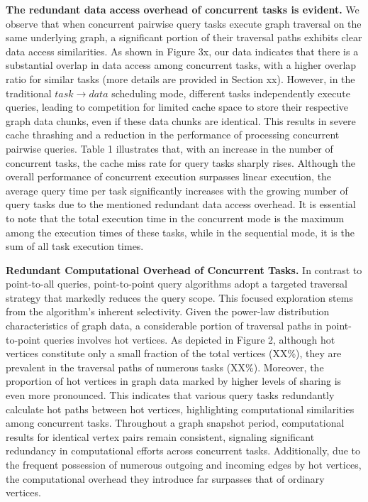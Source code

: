 \documentclass[lettersize,journal]{IEEEtran} %
\begin{document}
{\bf{The redundant data access overhead of concurrent tasks is evident.}} We observe that when concurrent pairwise query tasks execute graph traversal on the same underlying graph, a significant portion of their traversal paths exhibits clear data access similarities. As shown in Figure 3x, our data indicates that there is a substantial overlap in data access among concurrent tasks, with a higher overlap ratio for similar tasks (more details are provided in Section xx). However, in the traditional $task \rightarrow data$ scheduling mode, different tasks independently execute queries, leading to competition for limited cache space to store their respective graph data chunks, even if these data chunks are identical. This results in severe cache thrashing and a reduction in the performance of processing concurrent pairwise queries. Table 1 illustrates that, with an increase in the number of concurrent tasks, the cache miss rate for query tasks sharply rises. Although the overall performance of concurrent execution surpasses linear execution, the average query time per task significantly increases with the growing number of query tasks due to the mentioned redundant data access overhead. It is essential to note that the total execution time in the concurrent mode is the maximum among the execution times of these tasks, while in the sequential mode, it is the sum of all task execution times.


{\bf{Redundant Computational Overhead of Concurrent Tasks.}} In contrast to point-to-all queries, point-to-point query algorithms adopt a targeted traversal strategy that markedly reduces the query scope. This focused exploration stems from the algorithm's inherent selectivity. Given the power-law distribution characteristics of graph data, a considerable portion of traversal paths in point-to-point queries involves hot vertices. As depicted in Figure 2, although hot vertices constitute only a small fraction of the total vertices (XX\%), they are prevalent in the traversal paths of numerous tasks (XX\%). Moreover, the proportion of hot vertices in graph data marked by higher levels of sharing is even more pronounced. This indicates that various query tasks redundantly calculate hot paths between hot vertices, highlighting computational similarities among concurrent tasks. Throughout a graph snapshot period, computational results for identical vertex pairs remain consistent, signaling significant redundancy in computational efforts across concurrent tasks. Additionally, due to the frequent possession of numerous outgoing and incoming edges by hot vertices, the computational overhead they introduce far surpasses that of ordinary vertices.
\end{document}
